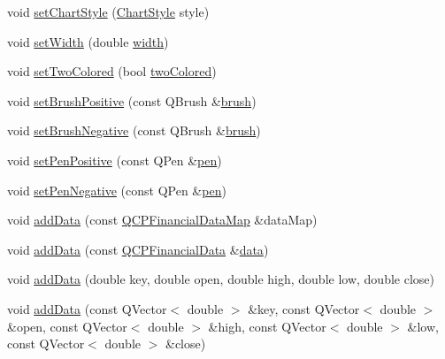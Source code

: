\begin{DoxyCompactItemize}
\item 
void \hyperlink{class_q_c_p_financial_a5a59175d36279d71596e64d7bb65596f}{set\+Chart\+Style} (\hyperlink{class_q_c_p_financial_a0f800e21ee98d646dfc6f8f89d10ebfb}{Chart\+Style} style)
\item 
void \hyperlink{class_q_c_p_financial_a99633f8bac86a61d534ae5eeb1a3068f}{set\+Width} (double \hyperlink{class_q_c_p_financial_a71ccaa04cdade0ec08a2117db6e4a4ce}{width})
\item 
void \hyperlink{class_q_c_p_financial_a138e44aac160a17a9676652e240c5f08}{set\+Two\+Colored} (bool \hyperlink{class_q_c_p_financial_a2bab30fc4eee38a0da3a05846b8d7ac7}{two\+Colored})
\item 
void \hyperlink{class_q_c_p_financial_a5ebff2b1764efd07cc44942e67821829}{set\+Brush\+Positive} (const Q\+Brush \&\hyperlink{class_q_c_p_abstract_plottable_aa74cdceb9c7286ef116fbfa58e0326e7}{brush})
\item 
void \hyperlink{class_q_c_p_financial_a8bbdd87629f9144b3ef51af660c0961a}{set\+Brush\+Negative} (const Q\+Brush \&\hyperlink{class_q_c_p_abstract_plottable_aa74cdceb9c7286ef116fbfa58e0326e7}{brush})
\item 
void \hyperlink{class_q_c_p_financial_ac58aa3adc7a35aab0088764b840683e5}{set\+Pen\+Positive} (const Q\+Pen \&\hyperlink{class_q_c_p_abstract_plottable_a41d060007cc6b3037c9c04d22d0c0398}{pen})
\item 
void \hyperlink{class_q_c_p_financial_afe5c07e94ccea01a75b3a2476993c346}{set\+Pen\+Negative} (const Q\+Pen \&\hyperlink{class_q_c_p_abstract_plottable_a41d060007cc6b3037c9c04d22d0c0398}{pen})
\item 
void \hyperlink{class_q_c_p_financial_a1a83396f97fcc68f2b7aa8d9782feffe}{add\+Data} (const \hyperlink{qcustomplot_8h_a745c09823fae0974b50beca9bc3b3d7d}{Q\+C\+P\+Financial\+Data\+Map} \&data\+Map)
\item 
void \hyperlink{class_q_c_p_financial_a3b6144b48a6a8e63236fc5bf70d40c00}{add\+Data} (const \hyperlink{class_q_c_p_financial_data}{Q\+C\+P\+Financial\+Data} \&\hyperlink{class_q_c_p_financial_a58e05aefa057d16edfcc0334cf81c241}{data})
\item 
void \hyperlink{class_q_c_p_financial_a688bbd052e00a02954ddb0068b378170}{add\+Data} (double key, double open, double high, double low, double close)
\item 
void \hyperlink{class_q_c_p_financial_aa1abe3bdafb297497f09cdbdc4db3958}{add\+Data} (const Q\+Vector$<$ double $>$ \&key, const Q\+Vector$<$ double $>$ \&open, const Q\+Vector$<$ double $>$ \&high, const Q\+Vector$<$ double $>$ \&low, const Q\+Vector$<$ double $>$ \&close)

\end{DoxyCompactItemize}
